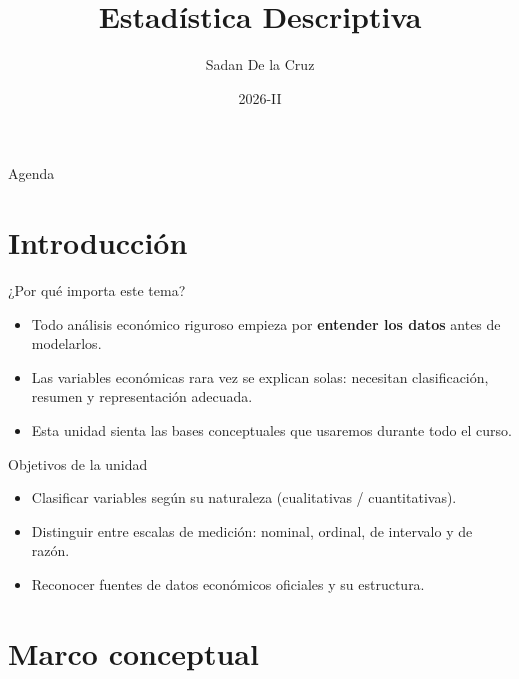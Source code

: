 \documentclass[aspectratio=169,11pt]{beamer}
\title{Estadística Descriptiva}
\author{Sadan De la Cruz}
\institute{Departamento de Economía, Universidad de Pamplona}
\date{2026-II}
\begin{document}
\maketitle

\begin{frame}{Agenda}
  \tableofcontents
\end{frame}

\section{Introducción}

\begin{frame}{¿Por qué importa este tema?}
  \begin{itemize}
    \item Todo análisis económico riguroso empieza por \textbf{entender los datos} antes de modelarlos.
    \item Las variables económicas rara vez se explican solas: necesitan clasificación, resumen y representación adecuada.
    \item Esta unidad sienta las bases conceptuales que usaremos durante todo el curso.
  \end{itemize}
\end{frame}

\begin{frame}{Objetivos de la unidad}
  \begin{itemize}
    \item Clasificar variables según su naturaleza (cualitativas / cuantitativas).
    \item Distinguir entre escalas de medición: nominal, ordinal, de intervalo y de razón.
    \item Reconocer fuentes de datos económicos oficiales y su estructura.
  \end{itemize}
\end{frame}

\section{Marco conceptual}
\end{document}
